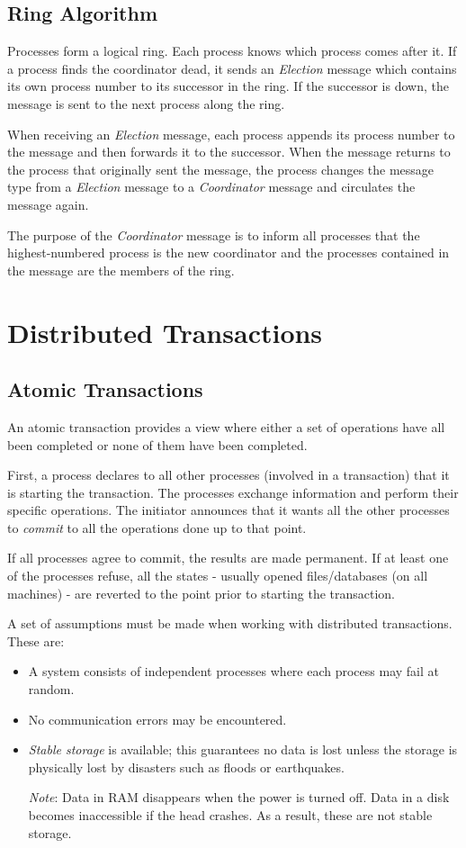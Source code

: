 \subsection{Ring Algorithm}
Processes form a logical ring. Each process knows which process comes after it. If a process finds the coordinator dead, it sends an \textit{Election} message which contains its own process number to its successor in the ring. If the successor is down, the message is sent to the next process along the ring. 

When receiving an \textit{Election} message, each process appends its process number to the message and then forwards it to the successor. When the message returns to the process that originally sent the message, the process changes the message type from a \textit{Election} message to a \textit{Coordinator} message and circulates the message again. 

The purpose of the \textit{Coordinator} message is to inform all processes that the highest-numbered process is the new coordinator and the processes contained in the message are the members of the ring. 

\section{Distributed Transactions}
\subsection{Atomic Transactions}
An atomic transaction provides a view where either a set of operations have all been completed or none of them have been completed.

First, a process declares to all other processes (involved in a transaction) that it is starting the transaction. The processes exchange information and perform their specific operations. The initiator announces that it wants all the other processes to \textit{commit} to all the operations done up to that point. 

If all processes agree to commit, the results are made permanent. If at least one of the processes refuse, all the states - usually opened files/databases (on all machines) - are reverted to the point prior to starting the transaction. 

A set of assumptions must be made when working with distributed transactions. These are: \begin{itemize}
\item A system consists of independent processes where each process may fail at random.
\item No communication errors may be encountered.  
\item \textit{Stable storage} is available; this guarantees no data is lost unless the storage is physically lost by disasters such as floods or earthquakes. 

\textit{Note}: Data in RAM disappears when the power is turned off. Data in a disk becomes inaccessible if the head crashes. As a result, these are not stable storage.
\end{itemize}

